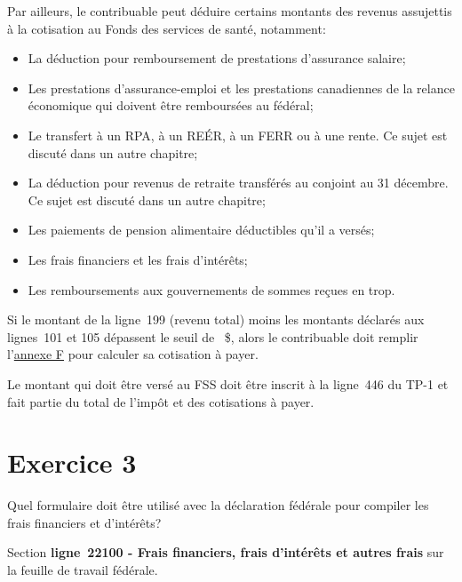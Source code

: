 Par ailleurs, le contribuable peut déduire certains montants des revenus assujettis à la cotisation au Fonds des services de santé, notamment:
\begin{itemize}
	\item La déduction pour remboursement de prestations d'assurance salaire;
	\item Les prestations d'assurance-emploi et les prestations canadiennes de la relance économique qui doivent être remboursées au fédéral;
	\item Le transfert à un RPA, à un REÉR, à un FERR ou à une rente. Ce sujet est discuté dans un autre chapitre;
	\item La déduction pour revenus de retraite transférés au conjoint au 31 décembre. Ce sujet est discuté dans un autre chapitre;
	\item Les paiements de pension alimentaire déductibles qu'il a versés;
	\item Les frais financiers et les frais d'intérêts;
	\item Les remboursements aux gouvernements de sommes reçues en trop.
\end{itemize}

Si le montant de la ligne~199 (revenu total) moins les montants déclarés aux lignes~101 et 105 dépassent le seuil de ~\$, alors le contribuable doit remplir l'\href{https://www.revenuquebec.ca/documents/fr/formulaires/tp/2023-12/TP-1.D.F%282023-12%29.pdf}{annexe F} pour calculer sa cotisation à payer.

Le montant qui doit être versé au FSS doit être inscrit à la ligne~446 du TP-1 et fait partie du total de l'impôt et des cotisations à payer.



\section{Exercice 3}
\setcounter{question}{0}
\begin{question}
	Quel formulaire doit être utilisé avec la déclaration fédérale pour compiler les frais financiers et d'intérêts?
\end{question}
Section \og \textbf{ligne~22100 - Frais financiers, frais d'intérêts et autres frais} \fg{} sur la feuille de travail fédérale.

